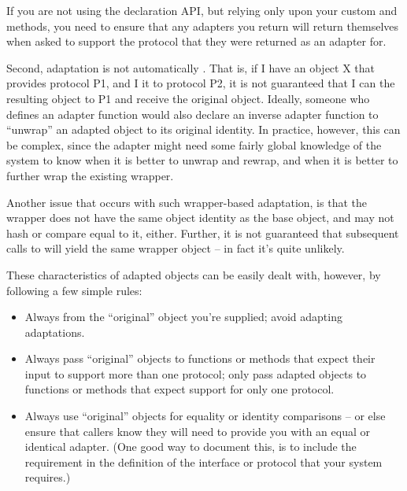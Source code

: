 If you are not using the declaration API, but relying only upon your custom
 and  methods, you need to ensure that
any adapters you return will return themselves when asked to support the
protocol that they were returned as an adapter for.

Second, adaptation is not automatically .  That is, if I have
an object X that provides protocol P1, and I  it to protocol
P2, it is not guaranteed that I can  the resulting object to
P1 and receive the original object.  Ideally, someone who defines an adapter
function would also declare an inverse adapter function to ``unwrap'' an
adapted object to its original identity.  In practice, however, this can be
complex, since the adapter might need some fairly global knowledge of the
system to know when it is better to unwrap and rewrap, and when it is better to
further wrap the existing wrapper.

Another issue that occurs with such wrapper-based adaptation, is that the
wrapper does not have the same object identity as the base object, and may not
hash or compare equal to it, either.  Further, it is not guaranteed that
subsequent calls to  will yield the same wrapper object -- in
fact it's quite unlikely.

These characteristics of adapted objects can be easily dealt with, however, by
following a few simple rules:



\begin{itemize}

\item Always  from the ``original'' object you're supplied;
avoid adapting adaptations.

\item Always pass ``original'' objects to functions or methods that expect
their input to support more than one protocol; only pass adapted objects to
functions or methods that expect support for only one protocol.

\item Always use ``original'' objects for equality or identity comparisons --
or else ensure that callers know they will need to provide you with an equal or
identical adapter.  (One good way to document this, is to include the
requirement in the definition of the interface or protocol that your system
requires.)

\end{itemize}


